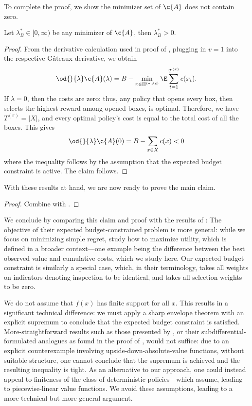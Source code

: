 \documentclass{article}
\begin{document}
To complete the proof, we show the minimizer set of $\c{A}$ does not contain zero.

\begin{lemma}
\label{lem:non_zero}
Let $\lambda^*_B \in [0,\infty)$ be any minimizer of $\c{A}$, then $\lambda^*_B > 0$.
\end{lemma}

\begin{proof}
From the derivative calculation used in proof of , plugging in $v = 1$ into the respective Gâteaux derivative, we obtain 
\[
\od{}{\lambda} \c{A}(\lambda) = B - \min_{\pi\in\Pi^{(*,\lambda c)}} \E \sum_{t=1}^{T^{(\pi)}} c(x_t)
.
\]
If $\lambda = 0$, then the costs are zero: thus, any policy that opens every box, then selects the highest reward among opened boxes, is optimal.
Therefore, we have $T^{(\pi)} = |X|$, and every optimal policy's cost is equal to the total cost of all the boxes. 
This gives
\[
\od{}{\lambda} \c{A}(0) = B - \sum_{x\in X} c(x) < 0
\]
where the inequality follows by the assumption that the expected budget constraint is active. The claim follows.
\end{proof}

With these results at hand, we are now ready to prove the main claim.

\ThmBudgetConstrained*

\begin{proof}
Combine  with .
\end{proof}

We conclude by comparing this claim and proof with the results of \textcite{aminian2023markovian}:
\1 The objective of their expected budget-constrained problem is more general: while we focus on minimizing simple regret, \textcite{aminian2023markovian} study how to maximize utility, which is defined in a broader context---one example being the difference between the best observed value and cumulative costs, which we study here. 
Our expected budget constraint is similarly a special case, which, in their terminology, takes all weights on indicators denoting inspection to be identical, and takes all selection weights to be zero. 

\2 We do not assume that $f(x)$ has finite support for all $x$.
This results in a significant technical difference: we must apply a sharp envelope theorem with an explicit supremum to conclude that the expected budget constraint is satisfied.
More-straightforward results such as those presented by \textcite{milgrom2002envelope}, or their subdifferential-formulated analogues as found in the proof of \textcite[Proposition 1 (iii)]{aminian2023markovian}, would not suffice: due to an explicit counterexample involving upside-down-absolute-value functions, without suitable structure, one cannot conclude that the supremum is achieved and the resulting inequality is tight.
As an alternative to our approach, one could instead appeal to finiteness of the class of deterministic policies---which \textcite{aminian2023markovian} assume, leading to piecewise-linear value functions.
We avoid these assumptions, leading to a more technical but more general argument.
\0
\end{document}
